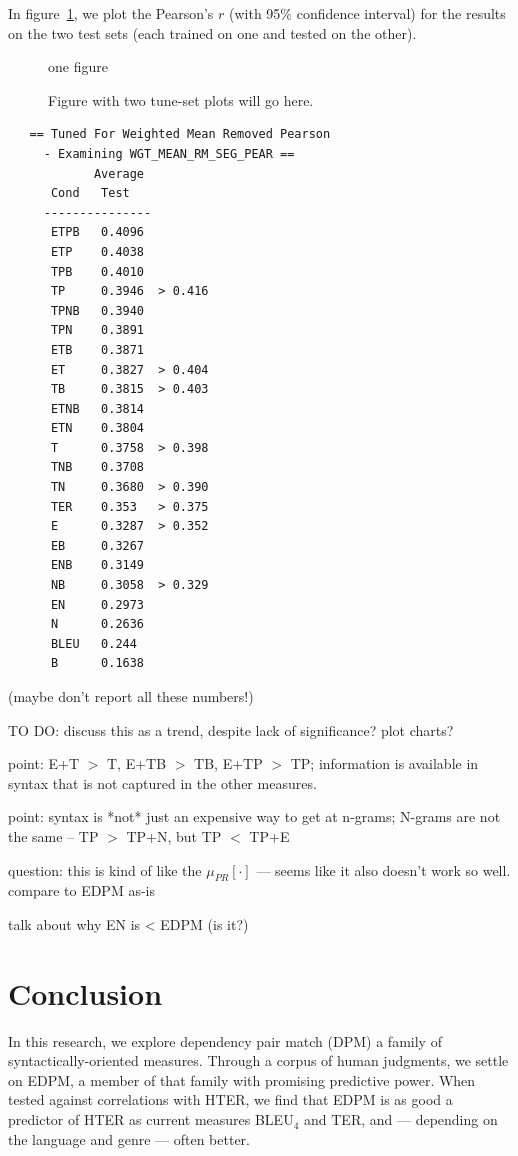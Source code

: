 \documentclass{kluwer}    %
\begin{document}
\begin{article}

In figure~\ref{fig:tuneresults}, we plot the Pearson's $r$ (with 95\%
confidence interval) for the results on the two test sets (each
trained on one and tested on the other).
\begin{figure}
  \centerline{{one figure}}
  \caption{Figure with two tune-set plots will go here.}
  \label{fig:tuneresults}
\end{figure}
   
\begin{verbatim}
   == Tuned For Weighted Mean Removed Pearson
     - Examining WGT_MEAN_RM_SEG_PEAR ==
            Average
      Cond   Test  
     ---------------
      ETPB   0.4096
      ETP    0.4038
      TPB    0.4010
      TP     0.3946  > 0.416
      TPNB   0.3940
      TPN    0.3891
      ETB    0.3871
      ET     0.3827  > 0.404
      TB     0.3815  > 0.403
      ETNB   0.3814
      ETN    0.3804
      T      0.3758  > 0.398
      TNB    0.3708
      TN     0.3680  > 0.390
      TER    0.353   > 0.375
      E      0.3287  > 0.352
      EB     0.3267
      ENB    0.3149
      NB     0.3058  > 0.329
      EN     0.2973
      N      0.2636
      BLEU   0.244
      B      0.1638
\end{verbatim}
(maybe don't report all these numbers!)

TO DO: discuss this as a trend, despite lack of significance? plot charts?
  
point: E+T $>$ T, E+TB $>$ TB, E+TP $>$ TP; information is available in
syntax that is not captured in the other measures.

point: syntax is *not* just an expensive way to get at n-grams;
N-grams are not the same -- TP $>$ TP+N, but TP $<$ TP+E

question: this is kind of like the $\mu_{PR}[\cdot]$ --- seems like it
also doesn't work so well. compare to EDPM as-is

talk about why EN is < EDPM (is it?)

\section{Conclusion}
\label{sec:conclusion}
In this research, we explore dependency pair match (DPM) a family of
syntactically-oriented measures.  Through a corpus of human judgments,
we settle on EDPM, a member of that family with promising predictive
power.  When tested against correlations with HTER, we find that EDPM
is as good a predictor of HTER as current measures BLEU$_4$ and TER,
and --- depending on the language and genre --- often better.



\end{article}
\end{document}

